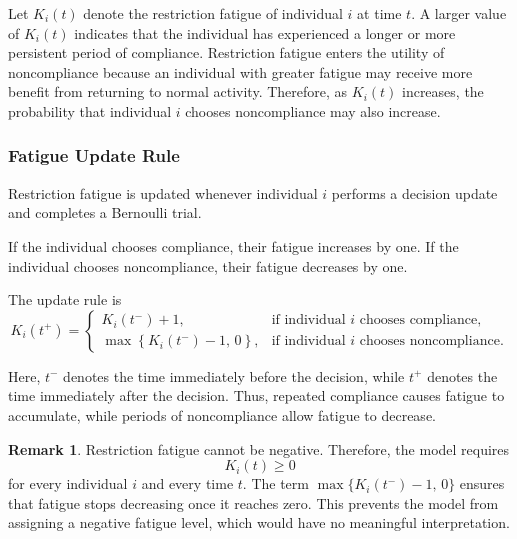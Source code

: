 \documentclass[11pt]{article}
\theoremstyle{definition}
\newtheorem{remark}{Remark}[section]
\theoremstyle{plain}
\begin{document}
Let $K_i(t)$ denote the restriction fatigue of individual $i$ at time $t$. A larger value of $K_i(t)$ indicates that the individual has experienced a longer or more persistent period of compliance.
Restriction fatigue enters the utility of noncompliance because an individual with greater fatigue may receive more benefit from returning to normal activity. Therefore, as $K_i(t)$ increases, the probability that individual $i$ chooses noncompliance may also increase.

\subsubsection{Fatigue Update Rule}
\label{sec:fatigue-rule}

Restriction fatigue is updated whenever individual $i$ performs a decision update and completes a Bernoulli trial.

If the individual chooses compliance, their fatigue increases by one. If the individual chooses noncompliance, their fatigue decreases by one.

The update rule is
\begin{equation}\label{eq:fatigue}
K_i(t^+)=
\begin{cases}
K_i(t^-)+1,
& \text{if individual } i \text{ chooses compliance},\\
\max\left\{K_i(t^-)-1,\,0\right\},
& \text{if individual } i \text{ chooses noncompliance}.
\end{cases}
\end{equation}

Here, $t^-$ denotes the time immediately before the decision, while $t^+$ denotes the time immediately after the decision. Thus, repeated compliance causes fatigue to accumulate, while periods of noncompliance allow fatigue to decrease.

\begin{remark}
Restriction fatigue cannot be negative. Therefore, the model requires
\begin{equation}
 K_i(t)\geq 0
\end{equation}
for every individual $i$ and every time $t$. The term $\max\{K_i(t^-)-1,\,0\}$ ensures that fatigue stops decreasing once it reaches zero. This prevents the model from assigning a negative fatigue level, which would have no meaningful interpretation.
\end{remark}
\end{document}
